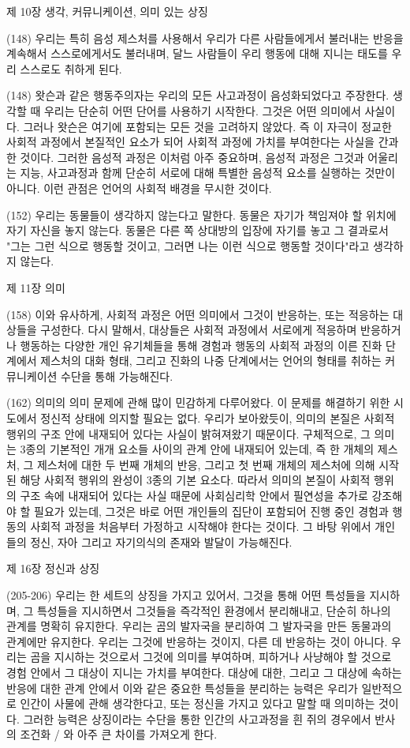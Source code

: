 \documentclass[12pt, a4paper]{article}
\begin{document}
제 10장 생각, 커뮤니케이션, 의미 있는 상징

(148) 우리는 특히 음성 제스처를 사용해서 우리가 다른 사람들에게서 불러내는 반응을 계속해서 스스로에게서도 불러내며, 달느 사람들이 우리 행동에 대해 지니는 태도를 우리 스스로도 취하게 된다.

(148) 왓슨과 같은 행동주의자는 우리의 모든 사고과정이 음성화되었다고 주장한다. 생각할 때 우리는 단순히 어떤 단어를 사용하기 시작한다. 그것은 어떤 의미에서 사실이다. 그러나 왓슨은 여기에 포함되는 모든 것을 고려하지 않았다. 즉 이 자극이 정교한 사회적 과정에서 본질적인 요소가 되어 사회적 과정에 가치를 부여한다는 사실을 간과한 것이다. 그러한 음성적 과정은 이처럼 아주 중요하며, 음성적 과정은 그것과 어울리는 지능, 사고과정과 함께 단순히 서로에 대해 특별한 음성적 요소를 실행하는 것만이 아니다. 이런 관점은 언어의 사회적 배경을 무시한 것이다.

(152) 우리는 동물들이 생각하지 않는다고 말한다. 동물은 자기가 책임져야 할 위치에 자기 자신을 놓지 않는다. 동물은 다른 쪽 상대방의 입장에 자기를 놓고 그 결과로서 "그는 그런 식으로 행동할 것이고, 그러면 나는 이런 식으로 행동할 것이다"라고 생각하지 않는다. 

제 11장 의미

(158) 이와 유사하게, 사회적 과정은 어떤 의미에서 그것이 반응하는, 또는 적응하는 대상들을 구성한다. 다시 말해서, 대상들은 사회적 과정에서 서로에게 적응하며 반응하거나 행동하는 다양한 개인 유기체들을 통해 경험과 행동의 사회적 과정의 이른 진화 단계에서 제스처의 대화 형태, 그리고 진화의 나중 단계에서는 언어의 형태를 취하는 커뮤니케이션 수단을 통해 가능해진다. 

(162) 의미의 의미 문제에 관해 많이 민감하게 다루어왔다. 이 문제를 해결하기 위한 시도에서 정신적 상태에 의지할 필요는 없다. 우리가 보아왔듯이, 의미의 본질은 사회적 행위의 구조 안에 내재되어 있다는 사실이 밝혀져왔기 때문이다. 구체적으로, 그 의미는 3종의 기본적인 개개 요소들 사이의 관계 안에 내재되어 있는데, 즉 한 개체의 제스처, 그 제스처에 대한 두 번째 개체의 반응, 그리고 첫 번째 개체의 제스처에 의해 시작된 해당 사회적 행위의 완성이 3종의 기본 요소다. 따라서 의미의 본질이 사회적 행위의 구조 속에 내재되어 있다는 사실 때문에 사회심리학 안에서 필연성을 추가로 강조해야 할 필요가 있는데, 그것은 바로 어떤 개인들의 집단이 포함되어 진행 중인 경험과 행동의 사회적 과정을 처음부터 가정하고 시작해야 한다는 것이다. 그 바탕 위에서 개인들의 정신, 자아 그리고 자기의식의 존재와 발달이 가능해진다.

제 16장 정신과 상징

(205-206) 우리는 한 세트의 상징을 가지고 있어서, 그것을 통해 어떤 특성들을 지시하며, 그 특성들을 지시하면서 그것들을 즉각적인 환경에서 분리해내고, 단순히 하나의 관계를 명확히 유지한다. 우리는 곰의 발자국을 분리하여 그 발자국을 만든 동물과의 관계에만 유지한다. 우리는 그것에 반응하는 것이지, 다른 데 반응하는 것이 아니다. 우리는 곰을 지시하는 것으로서 그것에 의미를 부여하며, 피하거나 사냥해야 할 것으로 경험 안에서 그 대상이 지니는 가치를 부여한다. 대상에 대한, 그리고 그 대상에 속하는 반응에 대한 관계 안에서 이와 같은 중요한 특성들을 분리하는 능력은 우리가 일반적으로 인간이 사물에 관해 생각한다고, 또는 정신을 가지고 있다고 말할 때 의미하는 것이다. 그러한 능력은 상징이라는 수단을 통한 인간의 사고과정을 흰 쥐의 경우에서 반사의 조건화 / 와 아주 큰 차이를 가져오게 한다. 
\end{document}
